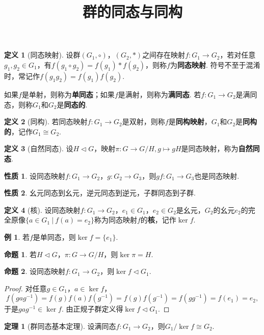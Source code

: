 \documentclass[12pt]{ctexart}
\title{\vspace{-2em}\textbf{群的同态与同构}\vspace{-2em}}
\date{ }
\theoremstyle{definition}
\newtheorem{definition}{定义}
\newtheorem{theorem}{定理}
\newtheorem{property}{性质}
\newtheorem{proposition}{命题}
\newtheorem{example}{例}
\theoremstyle{plain}
\begin{document}
	\maketitle
	\begin{definition}[同态映射]
		设群$(G_1,\circ)$，$(G_2,\ast)$之间存在映射$f:G_1\to G_2$，若对任意$g_1,g_2\in G_1$，有$f(g_1\circ g_2)=f(g_1)\ast f(g_2)$，则称$f$为\textbf{同态映射}. 符号不至于混淆时，常记作$f(g_1g_2)=f(g_1)f(g_2)$.
	\end{definition}
	如果$f$是单射，则称为\textbf{单同态}；如果$f$是满射，则称为\textbf{满同态}. 若$f:G_1\to G_2$是满同态，则称$G_1$和$G_2$是\textbf{同态的}.
	\begin{definition}[同构]
		若同态映射$f:G_1\to G_2$是双射，则称$f$是\textbf{同构映射}，$G_1$和$G_2$是\textbf{同构的}，记作$G_1\cong G_2$.
	\end{definition}
	\begin{definition}[自然同态]
		设$H\lhd G$，映射$\pi:G\to G/H,g\mapsto gH$是同态映射，称为\textbf{自然同态}.
	\end{definition}
	\begin{property}
		设同态映射$f:G_1\to G_2$，$g:G_2\to G_3$，则$gf:G_1\to G_3$也是同态映射.
	\end{property}
	\begin{property}
		幺元同态到幺元，逆元同态到逆元，子群同态到子群.
	\end{property}
	\begin{definition}[核]
		设同态映射$f:G_1\to G_2$，$e_1\in G_1$，$e_2\in G_2$是幺元，$G_2$的幺元$e_2$的完全原像$\{a\in G_1\ |\ f(a)=e_2\}$称为同态映射$f$的\textbf{核}，记作$\ker f$.
	\end{definition}
	\begin{example}
		若$f$是单同态，则$\ker f=\{e_1\}$.
	\end{example}
	\begin{proposition}
		若$H\lhd G$，$\pi:G\to G/H$，则$\ker\pi=H$.
	\end{proposition}
	\begin{proposition}
		设同态映射$f:G_1\to G_2$，则$\ker f\lhd G_1$.
	\end{proposition}
	\begin{proof}
		对任意$g\in G_1$，$a\in\ker f$，
		$$f(gag^{-1})=f(g)f(a)f(g^{-1})=f(g)f(g^{-1})=f(gg^{-1})=f(e_1)=e_2,$$
		于是$gag^{-1}\in\ker f$. 由正规子群定义得$\ker f\lhd G_1$.
	\end{proof}
	\begin{theorem}[群同态基本定理]
		设满同态$f:G_1\to G_2$，则$G_1/\ker f\cong G_2$.
	\end{theorem}
\end{document}
